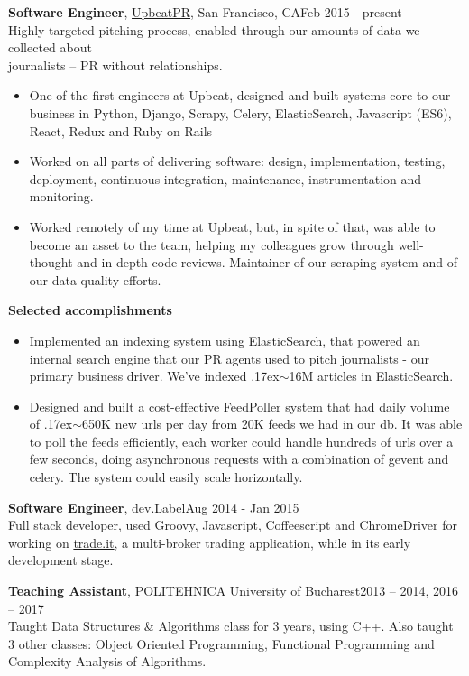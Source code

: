 \documentclass[line, margin]{resume}
\newcommand{\bettertilde}{\raise.17ex\hbox{$\scriptstyle\mathtt{\sim}$}}
\begin{document}
\begin{resume}
\textbf{Software Engineer}, \href{http://upbeatpr.com}{UpbeatPR}, San Francisco, CA\hfill Feb 2015 - present\\
Highly targeted pitching process, enabled through our amounts of data we collected about\\ journalists -- PR without relationships.
\begin{itemize} \itemsep -2pt  %
	\item One of the first engineers at Upbeat, designed and built systems core to our business in Python, Django, Scrapy, Celery, ElasticSearch, Javascript (ES6), React, Redux and Ruby on Rails
    \item Worked on all parts of delivering software: design, implementation, testing, deployment, continuous integration, maintenance, instrumentation and monitoring.
	\item Worked remotely  of my time at Upbeat, but, in spite of that, was able to become an asset to the team, helping my colleagues grow through well-thought and in-depth code reviews. Maintainer of our scraping system and of our data quality efforts.
\end{itemize}\vspace{-2.5mm}
\textbf{Selected accomplishments}
\begin{itemize} \itemsep -2pt  %
	\item Implemented an indexing system using ElasticSearch, that powered an internal search engine that our PR agents used to pitch journalists - our primary business driver. We've indexed \bettertilde16M articles in ElasticSearch.
	\item Designed and built a cost-effective FeedPoller system that had daily volume of \bettertilde650K new urls per day from 20K feeds we had in our db. It was able to poll the feeds efficiently, each worker could handle hundreds of urls over a few seconds, doing asynchronous requests with a combination of gevent and celery. The system could easily scale horizontally.
\end{itemize}

\textbf{Software Engineer}, \href{http://devlabel.com/}{dev.Label}\hfill Aug 2014 - Jan 2015\\
Full stack developer, used Groovy, Javascript, Coffeescript and ChromeDriver for working on \href{https://www.trade.it/}{trade.it}, a multi-broker trading application, while in its early development stage.

\textbf{Teaching Assistant}, POLITEHNICA University of Bucharest\hfill 2013 -- 2014, 2016 -- 2017\\
Taught Data Structures \& Algorithms class for 3 years, using C++. Also taught 3 other classes: Object Oriented Programming, Functional Programming and Complexity Analysis of Algorithms.


\end{resume}
\end{document}
